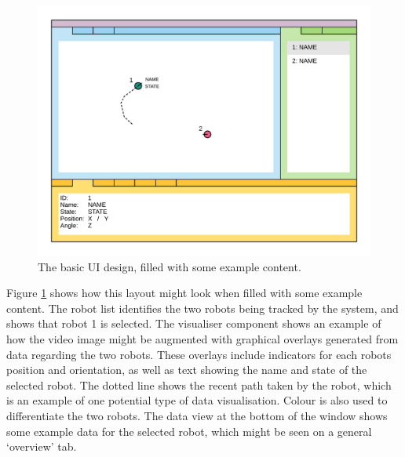 \begin{figure}[h]
	\centering
	\includegraphics[scale=1]{Figures/UIExample.png}
	\decoRule
	\caption[UI Example]{The basic UI design, filled with some example content.}
	\label{fig:UIExample}
\end{figure}

Figure \ref{fig:UIExample} shows how this layout might look when filled with some example content. The robot list identifies the two robots being tracked by the system, and shows that robot 1 is selected. The visualiser component shows an example of how the video image might be augmented with graphical overlays generated from data regarding the two robots. These overlays include indicators for each robots position and orientation, as well as text showing the name and state of the selected robot. The dotted line shows the recent path taken by the robot, which is an example of one potential type of data visualisation. Colour is also used to differentiate the two robots. The data view at the bottom of the window shows some example data for the selected robot, which might be seen on a general `overview' tab.

